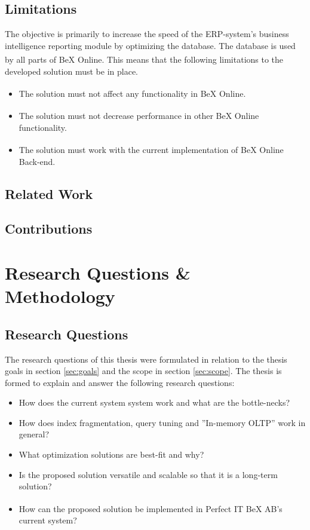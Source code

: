 \documentclass{cslthse-msc}
\newcommand{\bex}{BeX\textsuperscript{\textregistered} }
\begin{document}
\section{Limitations}

The objective is primarily to increase the speed of the ERP-system's business intelligence reporting module by optimizing the database. The database is used by all parts of \bex Online. This means that the following limitations to the developed solution must be in place.

\begin{itemize}
\item The solution must not affect any functionality in \bex Online.
\item The solution must not decrease performance in other \bex Online functionality.
\item The solution must work with the current implementation of \bex Online Back-end.
\end{itemize}

\section{Related Work}

\section{Contributions}

\chapter{Research Questions \& Methodology}

\section{Research Questions}
The research questions of this thesis were formulated in relation to the thesis goals in section \ref{sec:goals} and the scope in section \ref{sec:scope}. The thesis is formed to explain and answer the following research questions:
\begin{itemize}
\item	How does the current system system work and what are the bottle-necks?
\item 	How does index fragmentation, query tuning and ''In-memory OLTP'' work in general?
\item	What optimization solutions are best-fit and why?	
\item 	Is the proposed solution versatile and scalable so that it is a long-term solution?
\item	How can the proposed solution be implemented in Perfect IT \bex AB's current system?
\end{itemize}
\end{document}
